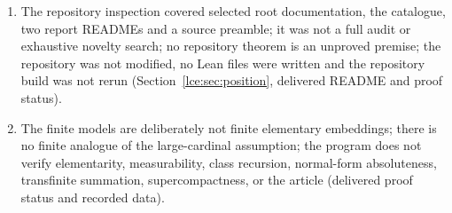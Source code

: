 \documentclass[11pt,letterpaper]{article}
\numberwithin{equation}{section}
\theoremstyle{definition}
\theoremstyle{remark}
\begin{document}
\begin{enumerate}[label=07.\arabic*]
(Section~\ref{lce:sec:questions}, delivered proof status).
\item The repository inspection covered selected root documentation, the
catalogue, two report READMEs and a source preamble; it was not a full audit
or exhaustive novelty search; no repository theorem is an unproved premise;
the repository was not modified, no Lean files were written and the
repository build was not rerun (Section~\ref{lce:sec:position}, delivered
README and proof status).
\item The finite models are deliberately not finite elementary embeddings;
there is no finite analogue of the large-cardinal assumption; the program
does not verify elementarity, measurability, class recursion, normal-form
absoluteness, transfinite summation, supercompactness, or the article
(delivered proof status and recorded data).
\end{enumerate}
\end{document}
